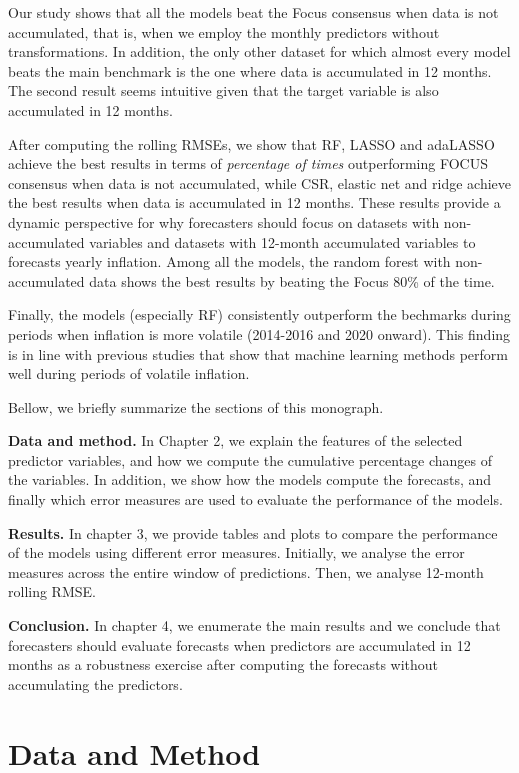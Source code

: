 \documentclass[12pt,openright,twoside,a4paper,brazil,english,emptypage,openany]{abntex2}
\begin{document}
Our study shows that all the models beat the Focus consensus when data is not accumulated, that is, when we employ the monthly predictors without transformations. In addition, the only other dataset for which almost every model beats the main benchmark is the one where data is accumulated in 12 months. The second result seems intuitive given that the target variable is also accumulated in 12 months.

After computing the rolling RMSEs, we show that RF, LASSO and adaLASSO achieve the best results in terms of \textit{percentage of times} outperforming FOCUS consensus when data is not accumulated, while CSR, elastic net and ridge achieve the best results when data is accumulated in 12 months. These results provide a dynamic perspective for why forecasters should focus on datasets with non-accumulated variables and datasets with 12-month accumulated variables to forecasts yearly inflation. Among all the models, the random forest with non-accumulated data shows the best results by beating the Focus 80\% of the time.

Finally, the models (especially RF) consistently outperform the bechmarks during periods when inflation is more volatile (2014-2016 and 2020 onward). This finding is in line with previous studies that show that machine learning methods perform well during periods of volatile inflation.

Bellow, we briefly summarize the sections of this monograph.

\textbf{Data and method.} In Chapter 2, we explain the features of the selected predictor variables, and how we compute the cumulative percentage changes of the variables. In addition, we show how the models compute the forecasts, and finally which error measures are used to evaluate the performance of the models.

\textbf{Results.} In chapter 3, we provide tables and plots to compare the performance of the models using different error measures. Initially, we analyse the error measures across the entire window of predictions. Then, we analyse 12-month rolling RMSE.

\textbf{Conclusion.} In chapter 4, we enumerate the main results and we conclude that forecasters should evaluate forecasts when predictors are accumulated in 12 months as a robustness exercise after computing the forecasts without accumulating the predictors.

\chapter{Data and Method}
\end{document}
